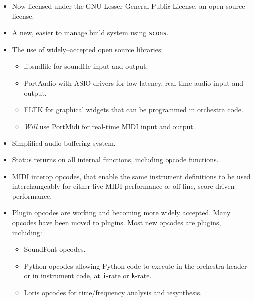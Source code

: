 \documentclass[10pt,letterpaper,onecolumn]{book}
\begin{document}
\begin{itemize}

\item Now licensed under the GNU Lesser General Public License, an open source license.

\item A new, easier to manage build system using \texttt{scons}.

\item The use of widely--accepted open source libraries:

\begin{itemize}

\item libsndfile for soundfile input and output.

\item PortAudio with ASIO drivers for low-latency, real-time audio input and output.

\item FLTK for graphical widgets that can be programmed in orchestra code.

\item \emph{Will} use PortMidi for real-time MIDI input and output.

\end{itemize}

\item Simplified audio buffering system.

\item Status returns on all internal functions, including opcode functions.

\item MIDI interop opcodes, that enable the same instrument definitions to be used interchangeably for either live MIDI performance or off-line, score-driven performance.

\item Plugin opcodes are working and becoming more widely accepted. Many opcodes have been moved to plugins. Most new opcodes are plugins, including:

\begin{itemize}

\item SoundFont opcodes.

\item Python opcodes allowing Python code to execute in the orchestra header or in instrument code, at \texttt{i}-rate or \texttt{k}-rate.

\item Loris opcodes for time/frequency analysis and resynthesis.


\end{itemize}
\end{itemize}
\end{document}
